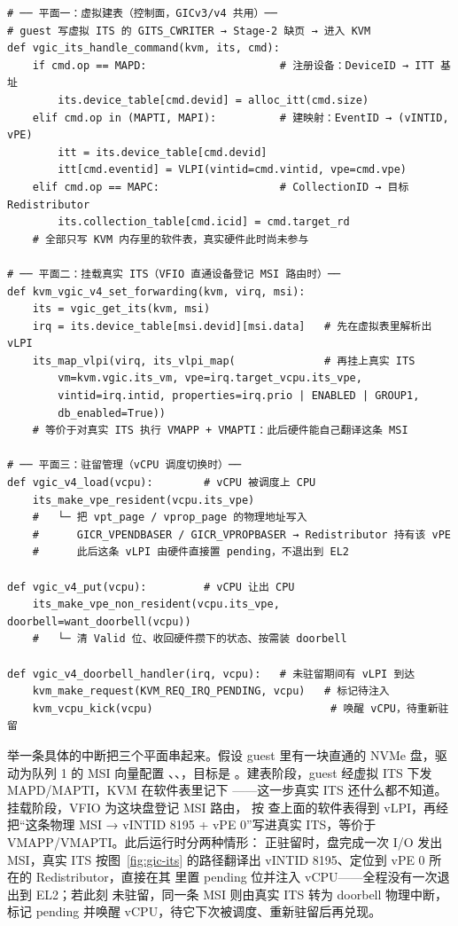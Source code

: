 \begin{lstlisting}[caption={KVM 组织 GICv4 直接注入的三个平面：虚拟建表、挂载真实 ITS、驻留管理（依据 vgic-its.c / vgic-v4.c / irq-gic-v3-its.c 整理的示意）},label={lst:vpe-lifecycle},style=pseudopy]
# ── 平面一：虚拟建表（控制面，GICv3/v4 共用）──
# guest 写虚拟 ITS 的 GITS_CWRITER → Stage-2 缺页 → 进入 KVM
def vgic_its_handle_command(kvm, its, cmd):
    if cmd.op == MAPD:                     # 注册设备：DeviceID → ITT 基址
        its.device_table[cmd.devid] = alloc_itt(cmd.size)
    elif cmd.op in (MAPTI, MAPI):          # 建映射：EventID → (vINTID, vPE)
        itt = its.device_table[cmd.devid]
        itt[cmd.eventid] = VLPI(vintid=cmd.vintid, vpe=cmd.vpe)
    elif cmd.op == MAPC:                   # CollectionID → 目标 Redistributor
        its.collection_table[cmd.icid] = cmd.target_rd
    # 全部只写 KVM 内存里的软件表，真实硬件此时尚未参与

# ── 平面二：挂载真实 ITS（VFIO 直通设备登记 MSI 路由时）──
def kvm_vgic_v4_set_forwarding(kvm, virq, msi):
    its = vgic_get_its(kvm, msi)
    irq = its.device_table[msi.devid][msi.data]   # 先在虚拟表里解析出 vLPI
    its_map_vlpi(virq, its_vlpi_map(              # 再挂上真实 ITS
        vm=kvm.vgic.its_vm, vpe=irq.target_vcpu.its_vpe,
        vintid=irq.intid, properties=irq.prio | ENABLED | GROUP1,
        db_enabled=True))
    # 等价于对真实 ITS 执行 VMAPP + VMAPTI：此后硬件能自己翻译这条 MSI

# ── 平面三：驻留管理（vCPU 调度切换时）──
def vgic_v4_load(vcpu):        # vCPU 被调度上 CPU
    its_make_vpe_resident(vcpu.its_vpe)
    #   └─ 把 vpt_page / vprop_page 的物理地址写入
    #      GICR_VPENDBASER / GICR_VPROPBASER → Redistributor 持有该 vPE
    #      此后这条 vLPI 由硬件直接置 pending，不退出到 EL2

def vgic_v4_put(vcpu):         # vCPU 让出 CPU
    its_make_vpe_non_resident(vcpu.its_vpe, doorbell=want_doorbell(vcpu))
    #   └─ 清 Valid 位、收回硬件攒下的状态、按需装 doorbell

def vgic_v4_doorbell_handler(irq, vcpu):   # 未驻留期间有 vLPI 到达
    kvm_make_request(KVM_REQ_IRQ_PENDING, vcpu)   # 标记待注入
    kvm_vcpu_kick(vcpu)                            # 唤醒 vCPU，待重新驻留
\end{lstlisting}

举一条具体的中断把三个平面串起来。假设 guest 里有一块直通的 NVMe 盘，驱动为队列 1 的 MSI 向量配置 、、，目标是 。建表阶段，guest 经虚拟 ITS 下发 MAPD/MAPTI，KVM 在软件表里记下 ——这一步真实 ITS 还什么都不知道。挂载阶段，VFIO 为这块盘登记 MSI 路由， 按  查上面的软件表得到 vLPI，再经  把“这条物理 MSI → vINTID 8195 + vPE 0”写进真实 ITS，等价于 VMAPP/VMAPTI。此后运行时分两种情形： 正驻留时，盘完成一次 I/O 发出 MSI，真实 ITS 按图~\ref{fig:gic-its} 的路径翻译出 vINTID 8195、定位到 vPE 0 所在的 Redistributor，直接在其  里置 pending 位并注入 vCPU——全程没有一次退出到 EL2；若此刻  未驻留，同一条 MSI 则由真实 ITS 转为 doorbell 物理中断， 标记 pending 并唤醒 vCPU，待它下次被调度、重新驻留后再兑现。

